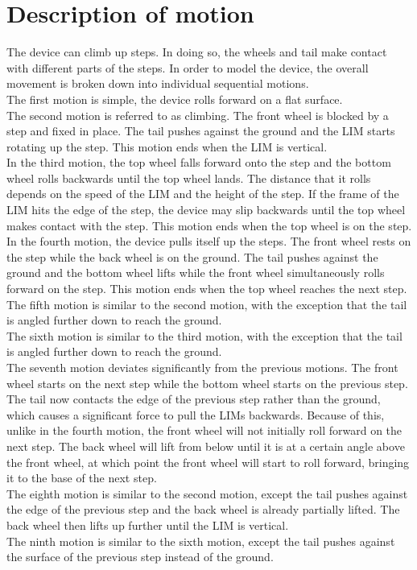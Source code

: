 \chapter{Description of motion}

The device can climb up steps. In doing so, the wheels and tail make contact with different parts of the steps. In order to model the device, the overall movement is broken down into individual sequential motions.\\
The first motion is simple, the device rolls forward on a flat surface.\\
The second motion is referred to as climbing. The front wheel is blocked by a step and fixed in place. The tail pushes against the ground and the LIM starts rotating up the step. This motion ends when the LIM is vertical.\\
In the third motion, the top wheel falls forward onto the step and the bottom wheel rolls backwards until the top wheel lands. The distance that it rolls depends on the speed of the LIM and the height of the step. If the frame of the LIM hits the edge of the step, the device may slip backwards until the top wheel makes contact with the step. This motion ends when the top wheel is on the step.\\
In the fourth motion, the device pulls itself up the steps. The front wheel rests on the step while the back wheel is on the ground. The tail pushes against the ground and the bottom wheel lifts while the front wheel simultaneously rolls forward on the step. This motion ends when the top wheel reaches the next step.\\
The fifth motion is similar to the second motion, with the exception that the tail is angled further down to reach the ground.\\
The sixth motion is similar to the third motion, with the exception that the tail is angled further down to reach the ground.\\
The seventh motion deviates significantly from the previous motions. The front wheel starts on the next step while the bottom wheel starts on the previous step. The tail now contacts the edge of the previous step rather than the ground, which causes a significant force to pull the LIMs backwards. Because of this, unlike in the fourth motion, the front wheel will not initially roll forward on the next step. The back wheel will lift from below until it is at a certain angle above the front wheel, at which point the front wheel will start to roll forward, bringing it to the base of the next step.\\
The eighth motion is similar to the second motion, except the tail pushes against the edge of the previous step and the back wheel is already partially lifted. The back wheel then lifts up further until the LIM is vertical.\\
The ninth motion is similar to the sixth motion, except the tail pushes against the surface of the previous step instead of the ground.
